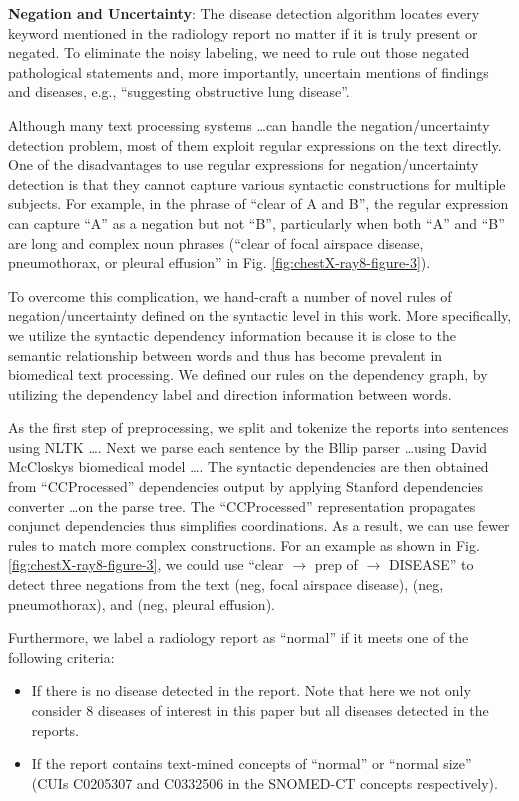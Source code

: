 \documentclass{article}
\begin{document}
\begin{singlespace}
\begin{multicols}{2}
{{\textbf{Negation and Uncertainty}: The disease detection algorithm locates every keyword mentioned in the radiology report no matter if it is truly present or negated. To eliminate the noisy labeling, we need to rule out those negated pathological statements and, more importantly, uncertain mentions of findings and diseases, e.g., “suggesting obstructive lung disease”.

Although many text processing systems \ldots can handle the negation/uncertainty detection problem, most of them exploit regular expressions on the text directly. One of the disadvantages to use regular expressions for negation/uncertainty detection is that they cannot capture various syntactic constructions for multiple subjects. For example, in the phrase of “clear of A and B”, the regular expression can capture “A” as a negation but not “B”, particularly when both “A” and “B” are long and complex noun phrases (“clear of focal airspace disease, pneumothorax, or pleural effusion” in Fig. \ref{fig:chestX-ray8-figure-3}).

To overcome this complication, we hand-craft a number of novel rules of negation/uncertainty defined on the syntactic level in this work. More specifically, we utilize the syntactic dependency information because it is close to the semantic relationship between words and thus has become prevalent in biomedical text processing. We defined our rules on the dependency graph, by utilizing the dependency label and direction information between words.

As the first step of preprocessing, we split and tokenize the reports into sentences using NLTK \ldots. Next we parse each sentence by the Bllip parser \ldots using David McCloskys biomedical model \ldots. The syntactic dependencies are then obtained from “CCProcessed” dependencies output by applying Stanford dependencies converter \ldots on the parse tree. The “CCProcessed” representation propagates conjunct dependencies thus simplifies coordinations. As a result, we can use fewer rules to match more complex constructions. For an example as shown in Fig. \ref{fig:chestX-ray8-figure-3}, we could use “clear $\rightarrow$ prep of $\rightarrow$ DISEASE” to detect three negations from the text (neg, focal airspace disease), (neg, pneumothorax), and (neg, pleural effusion).

Furthermore, we label a radiology report as “normal” if it meets one of the following criteria:

\begin{itemize}
    \item If there is no disease detected in the report. Note that here we not only consider 8 diseases of interest in this paper but all diseases detected in the reports.
    \item If the report contains text-mined concepts of “normal” or “normal size” (CUIs C0205307 and C0332506 in the SNOMED-CT concepts respectively).
\end{itemize}
} \cite{Wang2017}

}
\end{multicols}
\end{singlespace}
\end{document}
